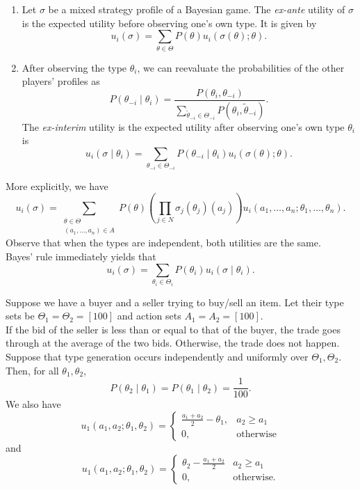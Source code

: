 	\begin{fdef}
		\phantom{pain}
		\begin{enumerate}
			\item Let $\sigma$ be a mixed strategy profile of a Bayesian game. The \emph{ex-ante} utility of $\sigma$ is the expected utility before observing one's own type. It is given by
			\[ u_i(\sigma) = \sum_{\theta \in \Theta} P(\theta) u_i(\sigma(\theta) ; \theta). \]
			\item After observing the type $\theta_i$, we can reevaluate the probabilities of the other players' profiles as
			\[ P(\theta_{-i} \mid \theta_i) = \frac{P(\theta_i,\theta_{-i})}{\sum_{\tilde{\theta}_{-i} \in \Theta_{-i}} P(\theta_i,\tilde{\theta}_{-i})}. \]
			The \emph{ex-interim} utility is the expected utility  after observing one's own type $\theta_i$ is
			\[ u_i(\sigma \mid \theta_i) = \sum_{\theta_{-i} \in \Theta_{-i}} P(\theta_{-i} \mid \theta_i) u_i(\sigma(\theta) ; \theta). \]
		\end{enumerate}
	\end{fdef}

	More explicitly, we have
	\[ u_i(\sigma) = \sum_{\substack{\theta \in \Theta \\ (a_1,\ldots,a_n) \in A}} P(\theta) \left(\prod_{j \in N} \sigma_j(\theta_j)(a_j)\right) u_i(a_1,\ldots,a_n ; \theta_1,\ldots,\theta_n). \]
	Observe that when the types are independent, both utilities are the same.\\

	Bayes' rule immediately yields that
	\[ u_i(\sigma) = \sum_{\theta_i \in \Theta_i} P(\theta_i) u_i(\sigma \mid \theta_i). \]

	\begin{fex}
		Suppose we have a buyer and a seller trying to buy/sell an item. Let their type sets be $\Theta_1 = \Theta_2 = [100]$ and action sets $A_1 = A_2 = [100]$.\\
		If the bid of the seller is less than or equal to that of the buyer, the trade goes through at the average of the two bids. Otherwise, the trade does not happen.\\
		Suppose that type generation occurs independently and uniformly over $\Theta_1,\Theta_2$. Then, for all $\theta_1,\theta_2$,
		\[ P(\theta_2 \mid \theta_1) = P(\theta_1 \mid \theta_2) = \frac{1}{100}. \]
		We also have
		\[ u_1(a_1,a_2;\theta_1,\theta_2) = \begin{cases} \frac{a_1+a_2}{2} - \theta_1, & a_2 \ge a_1 \\ 0, & \text{otherwise} \end{cases} \]
		and
		\[ u_1(a_1,a_2;\theta_1,\theta_2) = \begin{cases} \theta_2 - \frac{a_1+a_2}{2} & a_2 \ge a_1 \\ 0, & \text{otherwise.} \end{cases} \]
	\end{fex}


